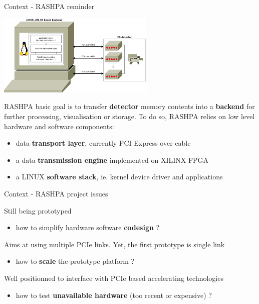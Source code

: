 \documentclass{beamer}
\begin{document}
\begin{frame}{Context - RASHPA reminder}
  \begin{center}
    \includegraphics[width=75mm]{pic/dv_reminder/main.jpeg}
  \end{center}
  \begin{tiny}
  RASHPA basic goal is to transfer \textbf{detector} memory contents into
  a \textbf{backend} for further processing, visualisation or storage. To
  do so, RASHPA relies on low level hardware and software components:\\
  \begin{itemize}
  \item data \textbf{transport layer}, currently PCI Express over cable
  \item a data \textbf{transmission engine} implemented on XILINX FPGA
  \item a LINUX \textbf{software stack}, ie. kernel device driver and applications
  \end{itemize}
  \end{tiny}
\end{frame}

\begin{frame}{Context - RASHPA project issues}
  \begin{small}
  Still being prototyped
  \begin{itemize}
  \item how to simplify hardware software \textbf{codesign} ?
  \end{itemize}

  Aims at using multiple PCIe links. Yet, the first prototype is single link
  \begin{itemize}
  \item how to \textbf{scale} the prototype platform ?
  \end{itemize}

  Well positionned to interface with PCIe based accelerating technologies
  \begin{itemize}
  \item how to test \textbf{unavailable hardware} (too recent or expensive) ?
  \end{itemize}
  \end{small}
\end{frame}
\end{document}
